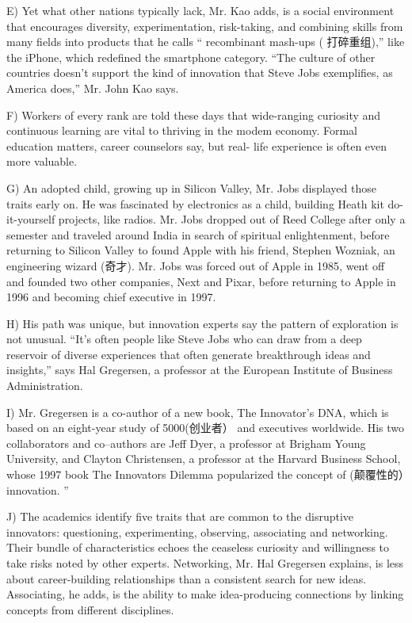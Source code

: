 \documentclass[UTF8,11pt]{ctexart}
\begin{document}
E) Yet what other nations typically lack, Mr. Kao adds, is a social environment that encourages diversity, experimentation, risk-taking, and combining skills from many fields into products that he calls “ recombinant mash-ups ( 打碎重组),” like the iPhone, which redefined the smartphone category. “The culture of other countries doesn’t support the kind of innovation that Steve Jobs exemplifies, as America does,” Mr. John Kao says.


F) Workers of every rank are told these days that wide-ranging curiosity and continuous learning are vital to thriving in the modem economy. Formal education matters, career counselors say, but real- life experience is often even more valuable.


G) An adopted child, growing up in Silicon Valley, Mr. Jobs displayed those traits early on. He was fascinated by electronics as a child, building Heath kit do-it-yourself projects, like radios. Mr. Jobs dropped out of Reed College after only a semester and traveled around India in search of spiritual enlightenment, before returning to Silicon Valley to found Apple with his friend, Stephen Wozniak, an engineering wizard (奇才). Mr. Jobs was forced out of Apple in 1985, went off and founded two other companies, Next and Pixar, before returning to Apple in 1996 and becoming chief executive in 1997.


H) His path was unique, but innovation experts say the pattern of exploration is not unusual. “It’s often people like Steve Jobs who can draw from a deep reservoir of diverse experiences that often generate breakthrough ideas and insights,” says Hal Gregersen, a professor at the European Institute of Business Administration.


I) Mr. Gregersen is a co-author of a new book, The Innovator's DNA, which is based on an eight-year study of 5000(创业者） and executives worldwide. His two collaborators and co--authors are Jeff Dyer, a professor at Brigham Young University, and Clayton Christensen, a professor at the Harvard Business School, whose 1997 book The Innovators Dilemma popularized the concept of (颠覆性的）innovation. ”


J) The academics identify five traits that are common to the disruptive innovators: questioning, experimenting, observing, associating and networking. Their bundle of characteristics echoes the ceaseless curiosity and willingness to take risks noted by other experts. Networking, Mr. Hal Gregersen explains, is less about career-building relationships than a consistent search for new ideas. Associating, he adds, is the ability to make idea-producing connections by linking concepts from different disciplines.
\end{document}
